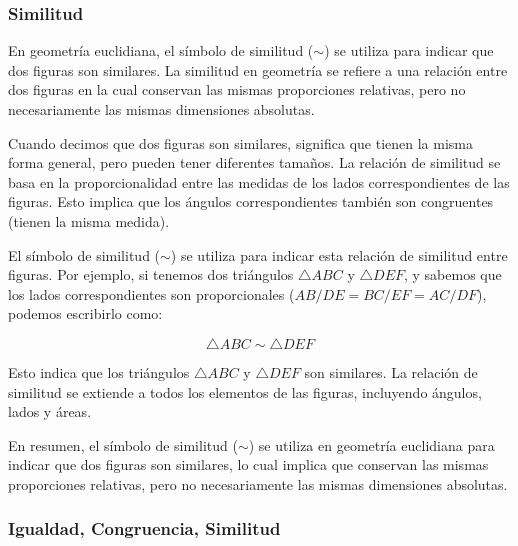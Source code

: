 \subsubsection{Similitud}

En geometría euclidiana, el símbolo de similitud ($\sim$) se utiliza para indicar que dos figuras son similares. La similitud en geometría se refiere a una relación entre dos figuras en la cual conservan las mismas proporciones relativas, pero no necesariamente las mismas dimensiones absolutas.

Cuando decimos que dos figuras son similares, significa que tienen la misma forma general, pero pueden tener diferentes tamaños. La relación de similitud se basa en la proporcionalidad entre las medidas de los lados correspondientes de las figuras. Esto implica que los ángulos correspondientes también son congruentes (tienen la misma medida).

El símbolo de similitud ($\sim$) se utiliza para indicar esta relación de similitud entre figuras. Por ejemplo, si tenemos dos triángulos $\triangle{ABC}$ y $\triangle{DEF}$, y sabemos que los lados correspondientes son proporcionales ($AB/DE = BC/EF = AC/DF$), podemos escribirlo como:

$$\triangle{ABC} \sim \triangle{DEF}$$

Esto indica que los triángulos $\triangle{ABC}$ y $\triangle{DEF}$ son similares. La relación de similitud se extiende a todos los elementos de las figuras, incluyendo ángulos, lados y áreas.

En resumen, el símbolo de similitud ($\sim$) se utiliza en geometría euclidiana para indicar que dos figuras son similares, lo cual implica que conservan las mismas proporciones relativas, pero no necesariamente las mismas dimensiones absolutas.

\subsubsection{Igualdad, Congruencia, Similitud}

